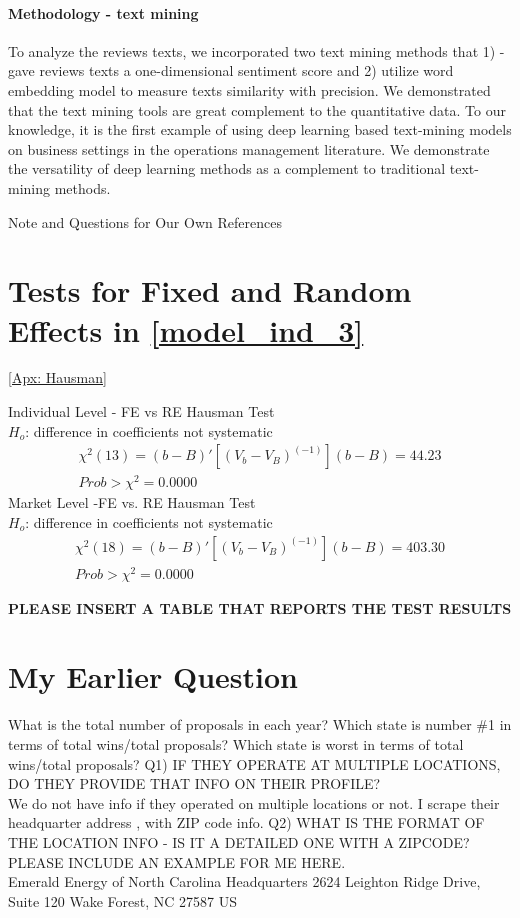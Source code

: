\documentclass[msom,blindrev]{informs3}
\begin{document}
\paragraph{Methodology - text mining} To analyze the reviews texts, we incorporated two text mining methods that 1) - gave reviews texts a one-dimensional sentiment score and 2) utilize word embedding model to measure texts similarity with precision. We demonstrated that the text mining tools are great complement to the quantitative data. To our knowledge, it is the first example of using deep learning based text-mining models on business settings in the operations management literature. We demonstrate the versatility of deep learning methods as a complement to traditional text-mining methods.
\begin{APPENDIX}{Note and Questions for Our Own References }



\section{Tests for Fixed and Random Effects in \eqref{model_ind_3}}\ref{Apx: Hausman}

 Individual Level - FE vs RE Hausman Test\\
 $H_o$:  difference in coefficients not systematic
\begin{align*}
\chi^{2}(13) = (b-B)'[(V_b-V_B)^(-1)](b-B)=44.23\\
Prob>\chi^{2} =0.0000
\end{align*}
Market Level -FE vs. RE Hausman Test\\
 $H_o$:  difference in coefficients not systematic
\begin{align*}
\chi^{2}(18) = (b-B)'[(V_b-V_B)^(-1)](b-B)=      403.30\\
Prob>\chi^{2} =0.0000
\end{align*}

\label{Apx: Hausman}
\textbf{PLEASE INSERT A TABLE THAT REPORTS THE TEST RESULTS}



\section{My Earlier Question}

What is the total number of proposals in each year?
Which state is number \#1 in terms of total wins/total proposals?
Which state is worst in terms of total wins/total proposals?
Q1) IF THEY OPERATE AT MULTIPLE LOCATIONS, DO THEY PROVIDE
THAT INFO ON THEIR PROFILE? \\
We do not have info if they operated on multiple locations or not. I scrape their headquarter address , with ZIP code info.
Q2) WHAT IS THE FORMAT OF THE LOCATION INFO - IS IT A DETAILED
ONE WITH A ZIPCODE? PLEASE INCLUDE AN EXAMPLE FOR ME HERE. \\
Emerald Energy of North Carolina Headquarters
2624 Leighton Ridge Drive, Suite 120
Wake Forest, NC
27587 US


\end{APPENDIX}
\end{document}
